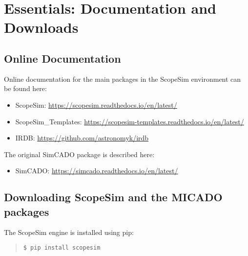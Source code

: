 

\section{Essentials: Documentation and Downloads%
  \label{essentials-documentation-and-downloads}%
}


\subsection{Online Documentation%
  \label{online-documentation}%
}

Online documentation for the main packages in the ScopeSim environment can be found here:

\begin{itemize}
\item ScopeSim: \url{https://scopesim.readthedocs.io/en/latest/}

\item ScopeSim\_Templates: \url{https://scopesim-templates.readthedocs.io/en/latest/}

\item IRDB: \url{https://github.com/astronomyk/irdb}
\end{itemize}

The original SimCADO package is described here:

\begin{itemize}
\item SimCADO: \url{https://simcado.readthedocs.io/en/latest/}
\end{itemize}



\subsection{Downloading ScopeSim and the MICADO packages%
  \label{downloading-scopesim-and-the-micado-packages}%
}

The ScopeSim engine is installed using pip:

\begin{quote}
\begin{alltt}
\begin{lstlisting}[frame=single]
$ pip install scopesim
\end{lstlisting}
\end{alltt}
\end{quote}

